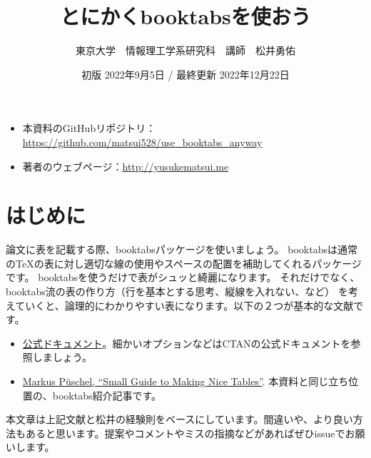 \documentclass[uplatex,onecolumn,9pt,dvipdfmx]{jsarticle}
\begin{document}
\title{とにかくbooktabsを使おう}
\author{東京大学　情報理工学系研究科　講師　松井勇佑}
\date{初版 2022年9月5日 / 最終更新 2022年12月22日}
\maketitle

\begin{screen}
    \begin{itemize}
    \item 本資料のGitHubリポジトリ： \url{https://github.com/matsui528/use_booktabs_anyway}
    \item 著者のウェブページ：\url{http://yusukematsui.me}
    \end{itemize}
\end{screen}

\section{はじめに}

論文に表を記載する際、booktabsパッケージを使いましょう。
booktabsは通常のTeXの表に対し適切な線の使用やスペースの配置を補助してくれるパッケージです。
booktabsを使うだけで表がシュッと綺麗になります。
それだけでなく、booktabs流の表の作り方（行を基本とする思考、縦線を入れない、など）
を考えていくと、論理的にわかりやすい表になります。以下の２つが基本的な文献です。
\begin{itemize}
    \item \href{http://mirrors.ctan.org/macros/latex/contrib/booktabs/booktabs.pdf}{公式ドキュメント}。細かいオプションなどはCTANの公式ドキュメントを参照しましょう。
    \item \href{https://people.inf.ethz.ch/markusp/teaching/guides/guide-tables.pdf}{Markus P\"{u}schel, ``Small Guide to Making Nice Tables''}. 本資料と同じ立ち位置の、booktabs紹介記事です。
\end{itemize}
本文章は上記文献と松井の経験則をベースにしています。間違いや、より良い方法もあると思います。提案やコメントやミスの指摘などがあればぜひissueでお願いします。
\end{document}
